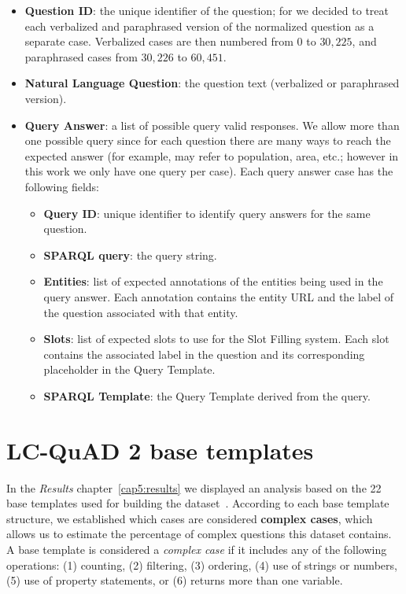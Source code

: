 \begin{itemize}
    \item \textbf{Question ID}: the unique identifier of the question; for \LCQuADtwo{} we decided to 
    treat each verbalized and paraphrased version of the normalized question as a separate case. 
    Verbalized cases are then numbered from $0$ to $30,225$, and paraphrased cases from $30,226$ to 
    $60,451$.
    \item \textbf{Natural Language Question}: the question text (verbalized or paraphrased version).
    \item \textbf{Query Answer}: a list of possible \SPARQL{} query valid responses. We allow more than 
    one possible query since for each question there are many ways to reach the expected answer (for 
    example,  may refer to population, area, etc.; however in 
    this work we only have one \SPARQL{} query per case). Each query answer case has the following fields:
    \begin{itemize}
        \item \textbf{Query ID}: unique identifier to identify query answers for the same question.
        \item \textbf{SPARQL query}: the \SPARQL{} query string.
        \item \textbf{Entities}: list of expected annotations of the entities being used in the 
        \SPARQL{} query answer. Each annotation contains the entity URL and the label of the question 
        associated with that entity.
        \item \textbf{Slots}: list of expected slots to use for the Slot Filling system. Each slot 
        contains the associated label in the question and its corresponding placeholder in the Query 
        Template.
        \item \textbf{SPARQL Template}: the Query Template derived from the \SPARQL{} query.
    \end{itemize}
\end{itemize}

\section{LC-QuAD 2 base templates}
\label{appendix:qaDataset/baseTemplates}
In the \textit{Results} chapter~\ref{cap5:results} we displayed an analysis based on the 22 base 
templates used for building 
the \LCQuADtwo{} dataset~\cite{dataset:lcquad2-DubeyBA019}. According to each base template structure, 
we established which cases are considered \textbf{complex cases}, which allows us to estimate the 
percentage of complex questions this dataset contains. A base template is considered a \textit{complex 
case} if it includes any of the following operations: (1) counting, (2) filtering, (3) ordering, 
(4) use of strings or numbers,(5) use of property statements, or (6) returns more than one variable. 

